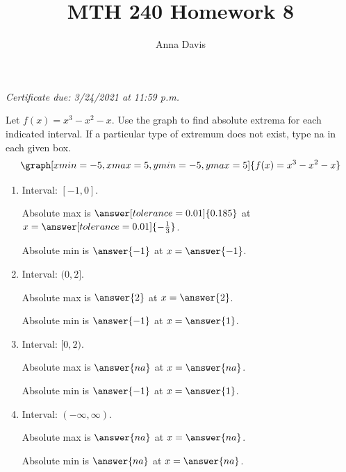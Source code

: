 \documentclass{ximera}
\author{Anna Davis} \title{MTH 240 Homework 8}
\begin{document}
\begin{abstract}

\end{abstract}
\maketitle
 \textit{Certificate due: 3/24/2021 at 11:59 p.m.}
 
\begin{problem}\label{prob:240HW8prob1}
Let $f(x)=x^3-x^2-x$.  Use the graph to find absolute extrema for each indicated interval.  If a particular type of extremum does not exist, type na in each given box.
\[
\graph[xmin=-5,xmax=5,ymin=-5,ymax=5]{f(x)=x^3-x^2-x} 
\]

\begin{enumerate}
    \item Interval: $[-1, 0]$.
    
    Absolute max is $\answer[tolerance=0.01]{0.185}$ at $x=\answer[tolerance=0.01]{-\frac{1}{3}}$.
    
    Absolute min is $\answer{-1}$ at $x=\answer{-1}$.
    
    \item Interval: $(0, 2]$.
    
    Absolute max is $\answer{2}$ at $x=\answer{2}$.
    
    Absolute min is $\answer{-1}$ at $x=\answer{1}$.
    
    \item Interval: $[0, 2)$.
    
    Absolute max is $\answer{na}$ at $x=\answer{na}$.
    
    Absolute min is $\answer{-1}$ at $x=\answer{1}$.
    
    \item Interval: $(-\infty, \infty)$.
    
    Absolute max is $\answer{na}$ at $x=\answer{na}$.
    
    Absolute min is $\answer{na}$ at $x=\answer{na}$.
\end{enumerate}
\end{problem}
\end{document}

